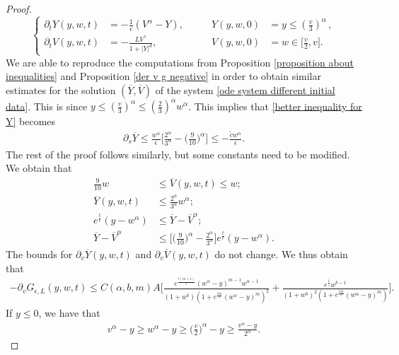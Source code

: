 \documentclass[11pt]{article}
\numberwithin{equation}{section}
\begin{document}
\begin{proof}
\begin{equation}
\left\{\begin{aligned}
\partial_{t}{Y}(y,w,t)&=-\frac{1}{\epsilon}({V}^{\alpha}-Y), & \qquad {Y}(y,w,0)&=y\leq (\frac{v}{3})^{\alpha}\,, \\
\partial_{t}{V}(y,w,t)&=-\frac{{L}{V}^{\gamma}}{1+|{Y}|^{d}},& \qquad {V}(y,w,0)&=w\in\Big[\frac{v}{2},v\Big].
   \end{aligned}\right.
   \end{equation}
   We are able to reproduce the computations from Proposition \ref{proposition about inequalities} and Proposition \ref{der v g negative} in order to obtain similar estimates for the solution $(\overline{Y},\overline{V})$ of the system \eqref{ode system different initial data}. This is since $y\leq (\frac{v}{3})^{\alpha}\leq (\frac{2}{3})^{\alpha}w^{\alpha}$. This implies that \eqref{better inequality for Y} becomes
   \begin{align}
      \partial_{s}\overline{Y}\leq \frac{w^{\alpha}}{\epsilon}\bigg[\frac{2^{\alpha}}{3^{\alpha}}-\Big(\frac{9}{10}\Big)^{\alpha}\bigg]\leq -\frac{\tilde{c} w^{\alpha}}{\epsilon}.
  \end{align}
  The rest of the proof follows similarly, but some constants need to be modified. We obtain that
  \begin{align*}
        \frac{9}{10} w &\leq  \overline{V}(y,w,t)\leq w;\\
     \overline{Y}(y,w,t)&\leq \frac{2^{\alpha}}{3^{\alpha}}w^{\alpha};\\
e^{\frac{t}{\epsilon}} (y-w^{\alpha}) & \leq   \overline{Y}-\overline{V}^{\alpha};\\
 \overline{Y}-\overline{V}^{\alpha}&\leq \bigg[\Big(\frac{9}{10}\Big)^{\alpha}-\frac{2^{\alpha}}{3^{\alpha}}\bigg] e^{\frac{t}{\epsilon}} (y-w^{\alpha}).
  \end{align*}
  The bounds for $\partial_{v}\overline{Y}(y,w,t)$ and $\partial_{v}\overline{V}(y,w,t)$ do not change. We thus obtain that
      \begin{align*}
           -\partial_{v}G_{\epsilon,L}(y,w,t)\leq C(\alpha,b,m)A\bigg[\frac{e^{\frac{t(m+1)}{\epsilon}}(w^{\alpha}-y)^{m-1}w^{\alpha-1}}{(1+w^{b})(1+e^{\frac{tm}{\epsilon}}(w^{\alpha}-y)^{m})^{2}}+\frac{e^{\frac{t}{\epsilon}}w^{b-1}}{(1+w^{b})^{2}(1+e^{\frac{tm}{\epsilon}}(w^{\alpha}-y)^{m})}\bigg].
     \end{align*}
     If $y\leq 0$, we have that
 \begin{align*}
  v^{\alpha}-y\geq w^{\alpha}-y\geq     \Big(\frac{v}{2}\Big)^{\alpha}-y\geq \frac{v^{\alpha}-y}{2^{\alpha}}. 

\end{align*}
\end{proof}
\end{document}
